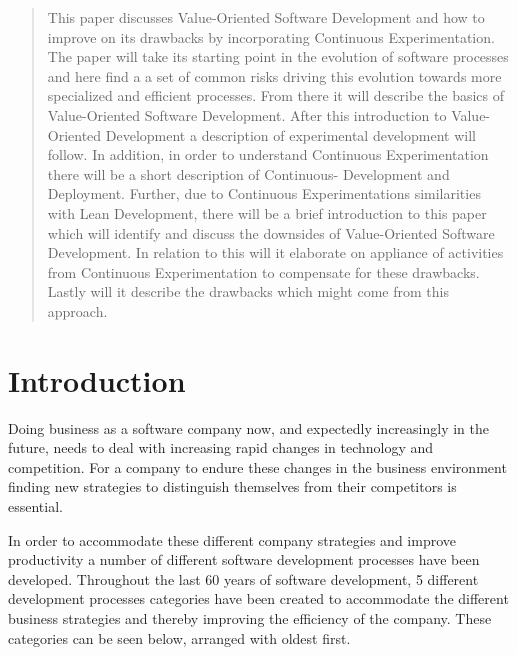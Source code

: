 \documentclass{sig-alternate}
\begin{document}
\maketitle
\begin{abstract}
This paper discusses Value-Oriented Software Development and how to improve on its drawbacks by 
incorporating Continuous Experimentation. The paper will take its starting point in the evolution 
of software processes and here find a a set of common risks driving this evolution towards more 
specialized and efficient processes. From there it will describe the basics of Value-Oriented 
Software Development. After this introduction to Value-Oriented Development a description of experimental 
development will follow. In addition, in order to understand Continuous Experimentation there will 
be a short description of Continuous- Development and Deployment. Further, due to Continuous 
Experimentations similarities with Lean Development, there will be a brief introduction to this 
paper which will identify and discuss the downsides of Value-Oriented Software Development. In 
relation to this will it elaborate on appliance of activities from Continuous Experimentation to 
compensate for these drawbacks. Lastly will it describe the drawbacks which might come from this approach. 
\end{abstract}


\section{Introduction}
Doing business as a software company now, and expectedly increasingly in the future, needs to deal 
with increasing rapid changes in technology and competition. For a company to endure these changes 
in the business environment finding new strategies to distinguish themselves from their competitors 
is essential\cite{stefan:valuebased}.       

In order to accommodate these different company strategies and improve productivity a number of 
different software development processes have been developed. 
Throughout the last 60 years of software development, 5 different development processes categories 
have been created to accommodate the different business strategies and thereby improving the 
efficiency of the company. These categories can be seen below, arranged with oldest first.
\end{document}
